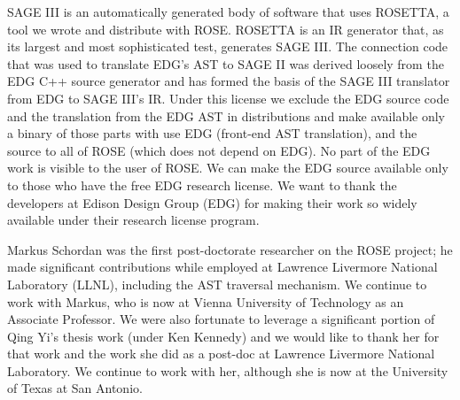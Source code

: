    SAGE III is an automatically generated body of software that uses ROSETTA, a tool we 
wrote and distribute with ROSE. ROSETTA is an IR generator that, as its largest and most
sophisticated test, generates SAGE III.  The connection code that was used to translate 
EDG's AST to SAGE II was derived loosely from the EDG C++ source generator and has
formed the basis of the SAGE III translator from EDG to SAGE III's IR. Under this license
we exclude the EDG source code and the translation from the EDG AST in distributions 
and make available only a binary of those parts with use EDG (front-end AST translation),
and the source to all of ROSE (which does not depend on EDG). No part of the EDG work is 
visible to the user of ROSE.  We can make the EDG source available only to those who have 
the free EDG research license.  We want to thank the developers at Edison Design Group
(EDG) for making their work so widely available under their research license program.

   Markus Schordan was the first post-doctorate researcher on the ROSE project; he made 
significant contributions while employed at Lawrence Livermore National Laboratory (LLNL), 
including the AST traversal mechanism.  We continue to work with Markus, who is now at 
Vienna University of Technology as an Associate Professor. We were also fortunate to 
leverage a significant portion of Qing Yi's thesis work (under Ken Kennedy) 
and we would like to thank her for that work and the work she did as a post-doc at Lawrence Livermore National Laboratory. 
We continue to work with her, although she is now at the University of Texas at San Antonio.

